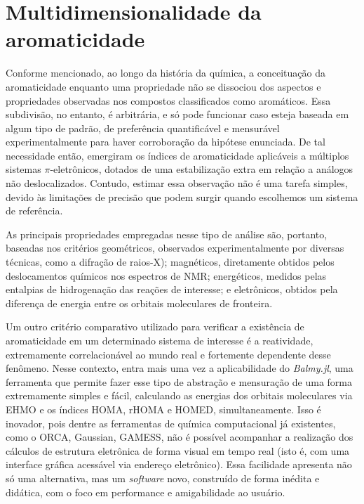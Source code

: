 \section{Multidimensionalidade da aromaticidade}

Conforme mencionado, ao longo da história da química, a conceituação da aromaticidade enquanto uma propriedade não se dissociou dos aspectos  e propriedades observadas nos compostos classificados como aromáticos. Essa subdivisão, no entanto, é arbitrária, e só pode funcionar caso esteja baseada em algum tipo de padrão, de preferência quantificável e mensurável experimentalmente para haver corroboração da hipótese enunciada. De tal necessidade então, emergiram os índices de aromaticidade aplicáveis a múltiplos sistemas $\pi$-eletrônicos, dotados de uma estabilização extra em relação a análogos não deslocalizados. Contudo, estimar essa observação não é uma tarefa simples, devido às limitações de precisão que podem surgir quando escolhemos um sistema de referência. 

As principais propriedades empregadas nesse tipo de análise são, portanto, baseadas nos critérios geométricos, observados experimentalmente por diversas técnicas, como a difração de raios-X); magnéticos, diretamente obtidos pelos deslocamentos químicos nos espectros de \gls{NMR}; energéticos, medidos pelas entalpias de hidrogenação das reações de interesse; e eletrônicos, obtidos pela diferença de energia entre os orbitais moleculares de fronteira.

Um outro critério comparativo utilizado para verificar a existência de aromaticidade em um determinado sistema de interesse é a reatividade, extremamente correlacionável ao mundo real e fortemente dependente desse fenômeno. Nesse contexto, entra mais uma vez a aplicabilidade do \textit{Balmy.jl}, uma ferramenta que permite fazer esse tipo de abstração e mensuração de uma forma extremamente simples e fácil, calculando as energias dos orbitais moleculares via \gls{EHMO} e os índices \gls{HOMA}, \gls{rHOMA} e \gls{HOMED}, simultaneamente. Isso é inovador, pois dentre as ferramentas de química computacional já existentes, como o ORCA, Gaussian, GAMESS, não é possível acompanhar a realização dos cálculos de estrutura eletrônica de forma visual em tempo real (isto é, com uma interface gráfica acessável via endereço eletrônico). Essa facilidade apresenta não só uma alternativa, mas um \textit{software} novo, construído de forma inédita e didática, com o foco em performance e amigabilidade ao usuário.

